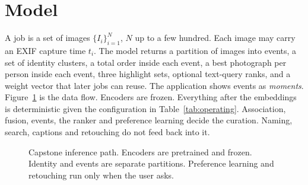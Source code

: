 \documentclass[conference]{IEEEtran}
\begin{document}
\section{Model}
\label{sec:model}

A job is a set of images $\{I_i\}_{i=1}^{N}$, $N$ up to a few hundred. Each
image may carry an EXIF capture time $t_i$. The model returns a partition of
images into events, a set of identity clusters, a total order inside each
event, a best photograph per person inside each event, three highlight sets,
optional text-query ranks, and a weight vector that later jobs can reuse.
The application shows events as \emph{moments}.
Figure~\ref{fig:pipeline} is the data flow. Encoders are frozen. Everything
after the embeddings is deterministic given the configuration in
Table~\ref{tab:operating}. Association, fusion, events, the ranker and
preference learning decide the curation. Naming, search, captions and
retouching do not feed back into it.

\begin{figure}[t]
\centering
{}
\caption{Capstone inference path. Encoders are pretrained and frozen. Identity
and events are separate partitions. Preference learning and retouching run
only when the user asks.}
\label{fig:pipeline}
\end{figure}
\end{document}
